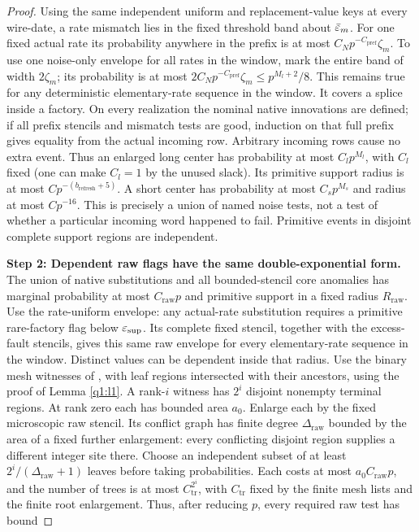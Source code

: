 \begin{proof}
Using the same independent uniform and replacement-value keys at every wire-date, a rate mismatch lies in the fixed threshold band about \(\bar{\varepsilon}_{m}\). For one fixed actual rate its probability anywhere in the prefix is at most \(C_{N} p^{-C_{\mathrm{pref}}} \zeta_{m}\). To use one noise-only envelope for all rates in the window, mark the entire band of width \(2\zeta_{m}\); its probability is at most \(2 C_{N} p^{-C_{\mathrm{pref}}} \zeta_{m}\le p^{M_{l}+2}/8\). This remains true for any deterministic elementary-rate sequence in the window. It covers a splice inside a factory. On every realization the nominal native innovations are defined; if all prefix stencils and mismatch tests are good, induction on that full prefix gives equality from the actual incoming row. Arbitrary incoming rows cause no extra event. Thus an enlarged long center has probability at most \(C_{l} p^{M_{l}}\), with \(C_{l}\) fixed (one can make \(C_{l}=1\) by the unused slack). Its primitive support radius is at most \(C p^{-(b_{\mathrm{refresh}}+5)}\). A short center has probability at most \(C_{s} p^{M_{s}}\) and radius at most \(C p^{-16}\). This is precisely a union of named noise tests, not a test of whether a particular incoming word happened to fail. Primitive events in disjoint complete support regions are independent.

\smallskip\noindent\textbf{Step 2: Dependent raw flags have the same double-exponential form.} The union of native substitutions and all bounded-stencil core anomalies has marginal probability at most \(C_{\mathrm{raw}} p\) and primitive support in a fixed radius \(R_{\mathrm{raw}}\). Use the rate-uniform envelope: any actual-rate substitution requires a primitive rare-factory flag below \(\varepsilon_{\mathrm{sup}}\). Its complete fixed stencil, together with the excess-fault stencils, gives this same raw envelope for every elementary-rate sequence in the window. Distinct values can be dependent inside that radius. Use the binary mesh witnesses of \cite[Lemma~\ref*{cl:lem:sparse-witness}]{DMNoise1D2026}, with leaf regions intersected with their ancestors, using the proof of Lemma \ref{q1:l1}. A rank-\(i\) witness has \(2^{i}\) disjoint nonempty terminal regions. At rank zero each has bounded area \(a_{0}\). Enlarge each by the fixed microscopic raw stencil. Its conflict graph has finite degree \(\Delta_{\mathrm{raw}}\) bounded by the area of a fixed further enlargement: every conflicting disjoint region supplies a different integer site there. Choose an independent subset of at least \(2^{i}/(\Delta_{\mathrm{raw}}+1)\) leaves before taking probabilities. Each costs at most \(a_{0} C_{\mathrm{raw}} p\), and the number of trees is at most \(C_{\mathrm{tr}}^{2^{i}}\), with \(C_{\mathrm{tr}}\) fixed by the finite mesh lists and the finite root enlargement. Thus, after reducing \(p\), every required raw test has bound



\end{proof}

